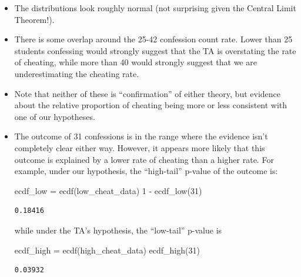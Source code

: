 \documentclass[
  letterpaper,
  DIV=11,
  numbers=noendperiod]{scrartcl}
\newenvironment{Shaded}{\begin{snugshade}}{\end{snugshade}}
\newcommand{\FloatTok}[1]{\textcolor[rgb]{0.68,0.00,0.00}{#1}}
\newcommand{\FunctionTok}[1]{\textcolor[rgb]{0.28,0.35,0.67}{#1}}
\newcommand{\NormalTok}[1]{\textcolor[rgb]{0.00,0.23,0.31}{#1}}
\newcommand{\OperatorTok}[1]{\textcolor[rgb]{0.37,0.37,0.37}{#1}}
\begin{document}
\begin{itemize}
\item
  The distributions look roughly normal (not surprising given the
  Central Limit Theorem!).
\item
  There is some overlap around the 25-42 confession count rate. Lower
  than 25 students confessing would strongly suggest that the TA is
  overstating the rate of cheating, while more than 40 would strongly
  suggest that we are underestimating the cheating rate.
\item
  Note that neither of these is ``confirmation'' of either theory, but
  evidence about the relative proportion of cheating being more or less
  consistent with one of our hypotheses.
\item
  The outcome of 31 confessions is in the range where the evidence isn't
  completely clear either way. However, it appears more likely that this
  outcome is explained by a lower rate of cheating than a higher rate.
  For example, under our hypothesis, the ``high-tail'' p-value of the
  outcome is:

\begin{Shaded}
\begin{Highlighting}[]
\NormalTok{ecdf\_low }\OperatorTok{=} \FunctionTok{ecdf}\NormalTok{(low\_cheat\_data)}
\FloatTok{1} \OperatorTok{{-}} \FunctionTok{ecdf\_low}\NormalTok{(}\FloatTok{31}\NormalTok{)}
\end{Highlighting}
\end{Shaded}

\begin{verbatim}
0.18416
\end{verbatim}

  while under the TA's hypothesis, the ``low-tail'' p-value is

\begin{Shaded}
\begin{Highlighting}[]
\NormalTok{ecdf\_high }\OperatorTok{=} \FunctionTok{ecdf}\NormalTok{(high\_cheat\_data)}
\FunctionTok{ecdf\_high}\NormalTok{(}\FloatTok{31}\NormalTok{)}
\end{Highlighting}
\end{Shaded}

\begin{verbatim}
0.03932
\end{verbatim}


\end{itemize}
\end{document}
